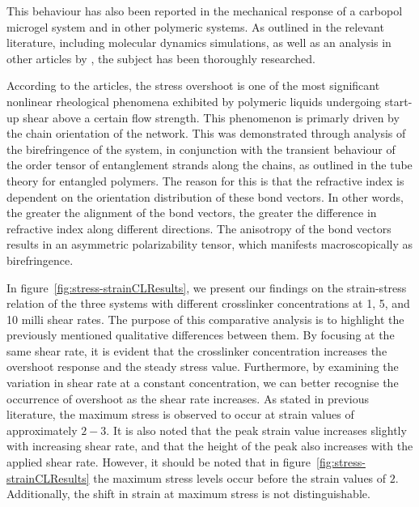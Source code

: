 This behaviour has also been reported in the mechanical response of a carbopol microgel system\citep{divouxStressOvershootSimple2011} and in other polymeric systems\citep{osakiStressOvershootPolymer2000a,ravindranathUniversalScalingCharacteristics2008,boukanyUniversalScalingBehavior2009}.
As outlined in the relevant literature, including molecular dynamics simulations\citep{jeongEffectChainOrientation2017,caoSimulatingStartupShear2015,mohagheghiMolecularlyBasedCriteria2016,baigFlowEffectsMelt2010a}, as well as an analysis in other articles by \citep{wangExploringStressOvershoot2009}, the subject has been thoroughly researched.

According to the articles\citep{jeongEffectChainOrientation2017,janeschitz-krieglPolymerMeltRheology1983,pearsonFlowInducedBirefringenceConcentrated1989,masubuchiPrimitiveChainNetwork2020}, the stress overshoot is one of the most significant nonlinear rheological phenomena exhibited by polymeric liquids undergoing start-up shear above a certain flow strength.
This phenomenon is primarly driven by the chain orientation of the network.
This was demonstrated through analysis of the birefringence of the system, in conjunction with the transient behaviour of the order tensor of entanglement strands along the chains, as outlined in the tube theory for entangled polymers.
The reason for this is that the refractive index is dependent on the orientation distribution of these bond vectors. 
In other words, the greater the alignment of the bond vectors, the greater the difference in refractive index along different directions. 
The anisotropy of the bond vectors results in an asymmetric polarizability tensor, which manifests macroscopically as birefringence.

In figure~\ref{fig:stress-strainCLResults}, we present our findings on the strain-stress relation of the three systems with different crosslinker concentrations at \num{1}, \num{5}, and \num{10} milli shear rates.
The purpose of this comparative analysis is to highlight the previously mentioned qualitative differences between them.
By focusing at the same shear rate, it is evident that the crosslinker concentration increases the overshoot response and the steady stress value.
Furthermore, by examining the variation in shear rate at a constant concentration, we can better recognise the occurrence of overshoot as the shear rate increases.
As stated in previous literature, the maximum stress is observed to occur at strain values of approximately $2-3$.
It is also noted that the peak strain value increases slightly with increasing shear rate, and that the height of the peak also increases with the applied shear rate.
However, it should be noted that in figure~\ref{fig:stress-strainCLResults} the maximum stress levels occur before the strain values of $2$. 
Additionally, the shift in strain at maximum stress is not distinguishable.

